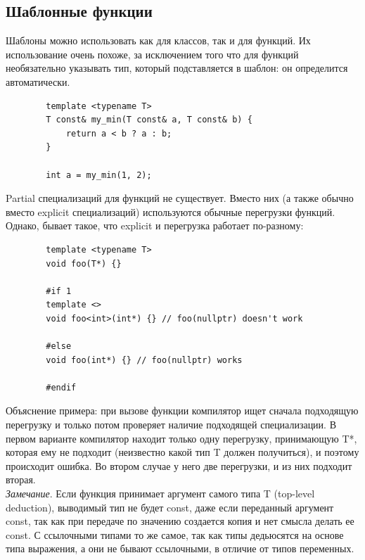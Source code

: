\documentclass[12pt, a4paper]{article}
\begin{document}
	\subsection{Шаблонные функции}
	\par Шаблоны можно использовать как для классов, так и для функций. Их использование очень похоже, за исключением того что для функций необязательно указывать тип, который подставляется в шаблон: он определится автоматически.
	\begin{verbatim}
		template <typename T>
		T const& my_min(T const& a, T const& b) {
			return a < b ? a : b;
		}
		
		int a = my_min(1, 2);
	\end{verbatim}
	\par Partial специализаций для функций не существует. Вместо них (а также обычно вместо explicit специализаций) используются обычные перегрузки функций. Однако, бывает такое, что explicit и перегрузка работает по-разному:
	\begin{verbatim}
		template <typename T>
		void foo(T*) {}
		
		#if 1
		template <>
		void foo<int>(int*) {} // foo(nullptr) doesn't work
		
		#else
		void foo(int*) {} // foo(nullptr) works
		
		#endif
	\end{verbatim}
	\par Объяснение примера: при вызове функции компилятор ищет сначала подходящую перегрузку и только потом проверяет наличие подходящей специализации. В первом варианте компилятор находит только одну перегрузку, принимающую T*, которая ему не подходит (неизвестно какой тип T должен получиться), и поэтому происходит ошибка. Во втором случае у него две перегрузки, и из них подходит вторая.
	\\\textit{Замечание}. Если функция принимает аргумент самого типа T (top-level deduction), выводимый тип не будет const, даже если переданный аргумент const, так как при передаче по значению создается копия и нет смысла делать ее const. С ссылочными типами то же самое, так как типы дедьюсятся на основе типа выражения, а они не бывают ссылочными, в отличие от типов переменных.
\end{document}
